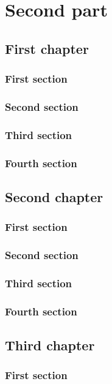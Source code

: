 \documentclass{researchbook}
\begin{document}
\part{Second part}
\chapter{First chapter}

\section{First section}\lipsum
\section{Second section}\lipsum
\section{Third section}\lipsum
\section{Fourth section}\lipsum


\chapter{Second chapter}

\section{First section}\lipsum
\section{Second section}\lipsum
\section{Third section}\lipsum
\section{Fourth section}\lipsum


\chapter{Third chapter}

\section{First section}\lipsum
\end{document}
